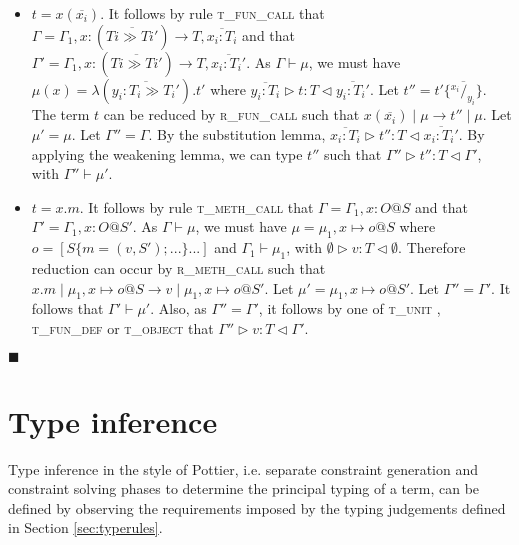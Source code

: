 \documentclass{article}
\newcommand{\rfunc}{\textsc{r\_fun\_call} }
\newcommand{\rmethc}{\textsc{r\_meth\_call} }
\newcommand{\tunit}{\textsc{t\_unit} }
\newcommand{\tobj}{\textsc{t\_object} }
\newcommand{\tfundef}{\textsc{t\_fun\_def} }
\newcommand{\tfunc}{\textsc{t\_fun\_call} }
\newcommand{\tmethc}{\textsc{t\_meth\_call} }
\newcommand{\typerule}[4]{#1 \triangleright #2 : #3 \triangleleft #4}
\newcommand{\subst}[3]{#3 \{\overline{^{#1}/_{#2}}\}}
\newcommand{\qed}{$\blacksquare$}
\newenvironment{proof}{\vspace{1ex}\noindent{\bf Proof}\hspace{0.5em}}
  {\hfill\qed\vspace{1ex}}
\begin{document}
\begin{proof}
\begin{itemize}
\item $t = x ( \overline{x_i} )$. It follows by rule \tfunc that
$\Gamma = \Gamma_1, x : (\overline{Ti \gg Ti'}) \rightarrow T, \overline{x_i : T_i}$ and that
$\Gamma' = \Gamma_1, x : (\overline{Ti \gg Ti'}) \rightarrow T, \overline{x_i : T_i'}$.
As $\Gamma \vdash \mu$, we must have $\mu(x) = \lambda(\overline{y_i : T_i \gg T_i'}).t'$
where $\typerule{\overline{y_i : T_i}}{t}{T}{\overline{y_i : T_i'}}$.
Let $t'' = \subst{x_i}{y_i}{t'} $.
The term $t$ can be reduced by \rfunc such that
$x ( \overline{x_i} ) \mid \mu \longrightarrow t'' \mid \mu$.
Let $\mu' = \mu$. Let $\Gamma'' = \Gamma$. By the substitution lemma, 
$\typerule{\overline{x_i : T_i}}{t''}{T}{\overline{x_i : T_i'}}$.
By applying the weakening lemma, we can type $t''$ such that
$\typerule{\Gamma''}{t''}{T}{\Gamma'}$,
with $\Gamma'' \vdash \mu'$.

\item $t = x.m$. It follows by rule \tmethc that
$\Gamma = \Gamma_1, x : O@S$ and that $\Gamma' = \Gamma_1, x : O@S'$. As
$\Gamma \vdash \mu$, we must have $\mu = \mu_1, x \mapsto o@S$ where
$o = [ S \{ m = (v,S') ; ... \} ... ]$ and
$\Gamma_1 \vdash \mu_1$, with 
$\typerule{\emptyset}{v}{T}{\emptyset}$.
Therefore reduction can occur by \rmethc such that
$x.m \mid \mu_1, x \mapsto o@S \longrightarrow v \mid \mu_1, x \mapsto o@S'$.
Let $\mu' = \mu_1, x \mapsto o@S'$. Let $\Gamma'' = \Gamma'$. It follows that
$\Gamma' \vdash \mu'$. Also, as $\Gamma'' = \Gamma'$, it follows by
one of \tunit, \tfundef or \tobj that 
$\typerule{\Gamma''}{v}{T}{\Gamma'}$.
\end{itemize}
\end{proof}

\section{Type inference}

Type inference in the style of Pottier, i.e. separate constraint generation
and constraint solving phases to determine the principal typing of a term,
can be defined by observing the requirements imposed by the typing judgements
defined in Section \ref{sec:typerules}.

\ottgrammartabular{
\ottC\ottinterrule
\ottctxc\ottinterrule
\otttyc\ottinterrule
\ottprotoc\ottinterrule
}
\end{document}
